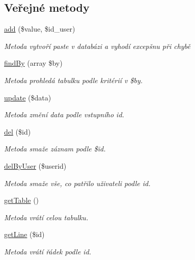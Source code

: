 \subsection*{Veřejné metody}
\begin{DoxyCompactItemize}
\item 
\hyperlink{classApp_1_1Model_1_1Pasters_a778c4b70c0f01cfbc8e5dc501cc2690a}{add} (\$value, \$id\-\_\-user)
\begin{DoxyCompactList}\small\item\em Metoda vytvoří paste v databázi a vyhodí excepšnu při chybě \end{DoxyCompactList}\item 
\hyperlink{classApp_1_1Model_1_1Pasters_aa16e80c8cde9bb0fb3297b7d0d9ec811}{find\-By} (array \$by)
\begin{DoxyCompactList}\small\item\em Metoda prohledá tabulku podle kritérií v \$by. \end{DoxyCompactList}\item 
\hyperlink{classApp_1_1Model_1_1Pasters_a541268fec1aa42f6e01f27c9cf898d68}{update} (\$data)
\begin{DoxyCompactList}\small\item\em Metoda změní data podle vstupního id. \end{DoxyCompactList}\item 
\hyperlink{classApp_1_1Model_1_1Pasters_aa411c7eb5396b9a3b3a94fd0b906d7d5}{del} (\$id)
\begin{DoxyCompactList}\small\item\em Metoda smaže záznam podle \$id. \end{DoxyCompactList}\item 
\hyperlink{classApp_1_1Model_1_1Pasters_a4490387bc6ed706b7fbac89a90d34786}{del\-By\-User} (\$userid)
\begin{DoxyCompactList}\small\item\em Metoda smaže vše, co patřilo uživateli podle id. \end{DoxyCompactList}\item 
\hyperlink{classApp_1_1Model_1_1Pasters_ae229992c1cb37e23b8ba08559cdae953}{get\-Table} ()
\begin{DoxyCompactList}\small\item\em Metoda vrátí celou tabulku. \end{DoxyCompactList}\item 
\hyperlink{classApp_1_1Model_1_1Pasters_a8e8331fb00d3369398bcbbe06822ee7c}{get\-Line} (\$id)
\begin{DoxyCompactList}\small\item\em Metoda vrátí řádek podle id. \end{DoxyCompactList}\item 

\end{DoxyCompactItemize}
